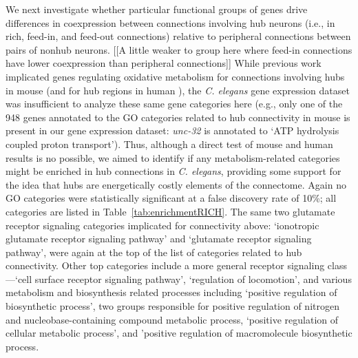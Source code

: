 \documentclass[10pt,letterpaper]{article}
\begin{document}
We next investigate whether particular functional groups of genes drive differences in coexpression between connections involving hub neurons (i.e., in rich, feed-in, and feed-out connections) relative to peripheral connections between pairs of nonhub neurons.
[[A little weaker to group here where feed-in connections have lower coexpression than peripheral connections]]
While previous work implicated genes regulating oxidative metabolism for connections involving hubs in mouse \cite{Fulcher:2016ck} (and for hub regions in human \cite{Vertes2016a}), the \emph{C. elegans} gene expression dataset was insufficient to analyze these same gene categories here (e.g., only one of the 948 genes annotated to the GO categories related to hub connectivity in mouse is present in our gene expression dataset: \emph{unc-32} is annotated to `ATP hydrolysis coupled proton transport').
Thus, although a direct test of mouse and human results is no possible, we aimed to identify if any metabolism-related categories might be enriched in hub connections in \emph{C. elegans}, providing some support for the idea that hubs are energetically costly elements of the connectome.
Again no GO categories were statistically significant at a false discovery rate of 10\%; all categories are listed in Table~\ref{tab:enrichmentRICH}.
The same two glutamate receptor signaling categories implicated for connectivity above: `ionotropic glutamate receptor signaling pathway' and `glutamate receptor signaling pathway', were again at the top of the list of categories related to hub connectivity.
Other top categories include a more general receptor signaling class---`cell surface receptor signaling pathway', `regulation of locomotion', and various metabolism and biosynthesis related processes including `positive regulation of biosynthetic process', two groups responsible for positive regulation of nitrogen and nucleobase-containing compound metabolic process, `positive regulation of cellular metabolic process', and 'positive regulation of macromolecule biosynthetic process.

\end{document}
